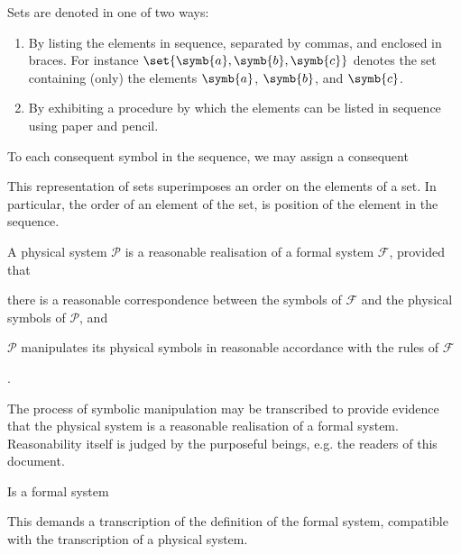 \begin{notation}

Sets are denoted in one of two ways:

\begin{enumerate}[(1)]

\item By listing the elements in sequence, separated by commas, and enclosed in
braces.  For instance $\set{\symb{a},\symb{b},\symb{c}}$ denotes the set
containing (only) the elements $\symb{a}$, $\symb{b}$, and $\symb{c}$.

\item By exhibiting a procedure by which the elements can be listed in sequence
using paper and pencil.

\end{enumerate}

\end{notation}

To each consequent symbol in the sequence, we may assign a consequent

\begin{remark}

This representation of sets superimposes an order on the elements of a set. In
particular, the order of an element of the set, is position of the element in
the sequence.

\end{remark}


A physical system $\mathcal{P}$ is a reasonable realisation of a formal system
$\mathcal{F}$, provided that\begin{inparaenum}[(1)]\item there is a reasonable
correspondence between the symbols of $\mathcal{F}$ and the physical symbols of
$\mathcal{P}$, and \item $\mathcal{P}$ manipulates its physical symbols in
reasonable accordance with the rules of $\mathcal{F}$\end{inparaenum}. 

The process of symbolic manipulation may be transcribed to provide evidence
that the physical system is a reasonable realisation of a formal system.
Reasonability itself is judged by the purposeful beings, e.g. the readers of
this document.

Is a formal system


This demands a transcription of the definition of the formal system, compatible
with the transcription of a physical system.

